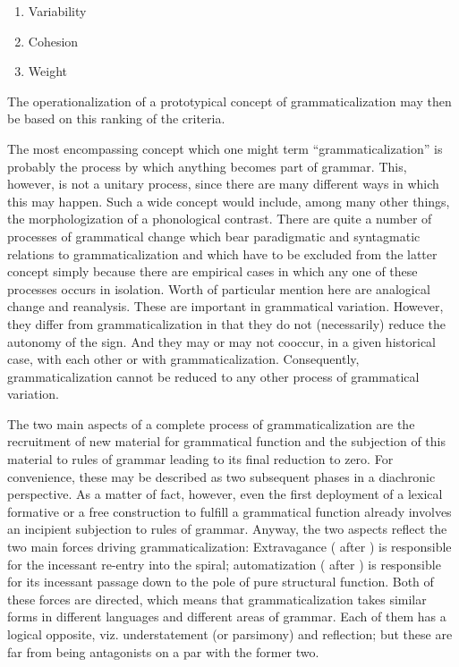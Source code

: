 \begin{enumerate}
\item Variability
\item Cohesion
\item Weight
\end{enumerate}

\noindent The operationalization of a prototypical concept of grammaticalization may then be based on this ranking of the criteria.

The most encompassing concept which one might term ``grammaticalization'' is probably the process by which anything becomes part of grammar. This, however, is not a unitary process, since there are many different ways in which this may happen. Such a wide concept would include, among many other things, the morphologization of a phonological contrast. There are quite a number of processes of grammatical change which bear paradigmatic and syntagmatic relations to grammaticalization and which have to be excluded from the latter concept simply because there are empirical cases in which any one of these processes occurs in isolation. Worth of particular mention here are analogical change and reanalysis. These are important in grammatical variation. However, they differ from grammaticalization in that they do not (necessarily) reduce the autonomy of the sign. And they may or may not cooccur, in a given historical case, with each other or with grammaticalization. Consequently, grammaticalization cannot be reduced to any other process of grammatical variation.

The two main aspects of a complete process of grammaticalization are the recruitment of new material for grammatical function and the subjection of this material to rules of grammar leading to its final reduction to zero. For convenience, these may be described as two subsequent phases in a diachronic perspective. As a matter of fact, however, even the first deployment of a lexical formative or a free construction to fulfill a grammatical function already involves an incipient subjection to rules of grammar. Anyway, the two aspects reflect the two main forces driving grammaticalization: Extravagance (\citealt{Haspelmath1999} after \citealt{Lehmann1975}) is responsible for the incessant re-entry into the spiral; automatization (\citealt{Lehmann2004} after \citealt{Givon1989}) is responsible for its incessant passage down to the pole of pure structural function. Both of these forces are directed, which means that grammaticalization takes similar forms in different languages and different areas of grammar. Each of them has a logical opposite, viz. understatement (or parsimony) and reflection; but these are far from being antagonists on a par with the former two.

